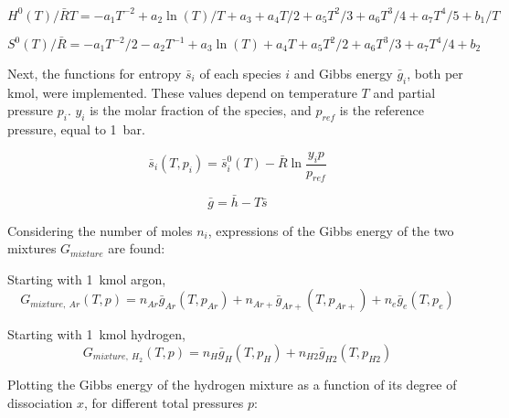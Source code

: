         \begin{equation}
            H^0 (T)/\bar RT = -a_1 T^{-2} + a_2 \ln(T)/T + a_3 + a_4 T / 2 + a_5 {T^2}/3 + a_6 {T^3}/4 + a_7 {T^4}/5 + b_1/T
        \end{equation}
        
        \begin{equation}
            S^0(T)/\bar R = -a_1 T^{-2}/2 - a_2 T^{-1} + a_3\ln(T) + a_4   T + a_5 {T^2}/2 + a_6 T^3/3 + a_7 T^4/4 + b_2
        \end{equation}

        Next, the functions for entropy $\bar s_i$ of each species $i$ and Gibbs energy $\bar g_i$, both per \unit{kmol}, were implemented. These values depend on temperature $T$ and partial pressure $p_i$. $y_i$ is the molar fraction of the species, and $p_{ref}$ is the reference pressure, equal to \qty{1}{bar}.
        
        \begin{equation}
            \bar s_i (T, p_i) = \bar s_i^0 (T) - \bar R \ln \frac{y_i p}{p_{ref}}
        \end{equation}

        \begin{equation}
            \bar g = \bar h - T \bar s
        \end{equation}

        Considering the number of moles $n_i$, expressions of the Gibbs energy of the two mixtures $G_{mixture}$ are found:

        Starting with \qty{1}{kmol} argon,
        \begin{equation}
            G_{mixture,\: Ar}(T, p) = n_{Ar} \bar g_{Ar}(T, p_{Ar}) + n_{Ar+} \bar g_{Ar+}(T, p_{Ar+}) + n_e \bar g_e(T, p_e)
        \end{equation}

        Starting with \qty{1}{kmol} hydrogen,
        \begin{equation}
            G_{mixture,\: H_2}(T, p) = n_H \bar g_H(T, p_H) + n_{H2} \bar g_{H2}(T, p_{H2})
        \end{equation}

        Plotting the Gibbs energy of the hydrogen mixture as a function of its degree of dissociation $x$, for different total pressures $p$:

